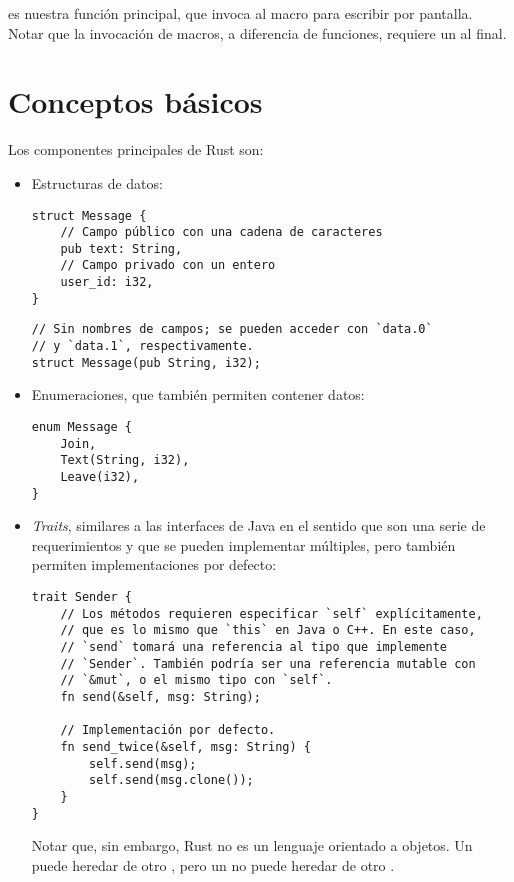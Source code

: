  es nuestra función principal, que invoca al macro 
para escribir por pantalla. Notar que la invocación de macros, a diferencia de
funciones, requiere un \code{!} al final.

\section{Conceptos básicos}

Los componentes principales de Rust son:

\begin{itemize}
    \item Estructuras de datos:

\begin{verbatim}
struct Message {
    // Campo público con una cadena de caracteres
    pub text: String,
    // Campo privado con un entero
    user_id: i32,
}
\end{verbatim}

\begin{verbatim}
// Sin nombres de campos; se pueden acceder con `data.0`
// y `data.1`, respectivamente.
struct Message(pub String, i32);
\end{verbatim}

    \item Enumeraciones, que también permiten contener datos:

\begin{verbatim}
enum Message {
    Join,
    Text(String, i32),
    Leave(i32),
}
\end{verbatim}

    \item \emph{Traits}, similares a las interfaces de Java en el sentido que
        son una serie de requerimientos y que se pueden implementar múltiples,
        pero también permiten implementaciones por defecto:

\begin{verbatim}
trait Sender {
    // Los métodos requieren especificar `self` explícitamente,
    // que es lo mismo que `this` en Java o C++. En este caso,
    // `send` tomará una referencia al tipo que implemente
    // `Sender`. También podría ser una referencia mutable con
    // `&mut`, o el mismo tipo con `self`.
    fn send(&self, msg: String);

    // Implementación por defecto.
    fn send_twice(&self, msg: String) {
        self.send(msg);
        self.send(msg.clone());
    }
}
\end{verbatim}

    Notar que, sin embargo, Rust no es un lenguaje orientado a objetos. Un
    \trait puede heredar de otro \trait, pero un \struct no puede heredar de
    otro \struct.

\end{itemize}

